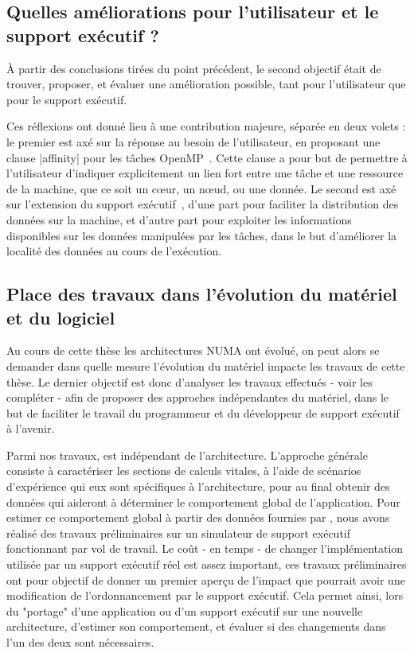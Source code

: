 \subsection*{Quelles améliorations pour l'utilisateur et le support exécutif ?}

À partir des conclusions tirées du point précédent, le second objectif était de trouver, proposer, et évaluer une amélioration possible, tant pour l'utilisateur que pour le support exécutif.

Ces réflexions ont donné lieu à une contribution majeure, séparée en deux volets : le premier est axé sur la réponse au besoin de l'utilisateur, en proposant une clause |affinity| pour les tâches OpenMP~\cite{Virouleau2016b}.
Cette clause a pour but de permettre à l'utilisateur d'indiquer explicitement un lien fort entre une tâche et une ressource de la machine, que ce soit un cœur, un nœud, ou une donnée.
Le second est axé sur l'extension du support exécutif~\cite{Virouleau2016a}, d'une part pour faciliter la distribution des données sur la machine, et d'autre part pour exploiter les informations disponibles sur les données manipulées par les tâches, dans le but d'améliorer la localité des données au cours de l'exécution.


\subsection*{Place des travaux dans l'évolution du matériel et du logiciel}

Au cours de cette thèse les architectures NUMA ont évolué, on peut alors se demander dans quelle mesure l'évolution du matériel impacte les travaux de cette thèse.
Le dernier objectif est donc d'analyser les travaux effectués - voir les compléter - afin de proposer des approches indépendantes du matériel, dans le but de faciliter le travail du programmeur et du développeur de support exécutif à l'avenir.

Parmi nos travaux, \outil est indépendant de l'architecture. L'approche générale consiste à caractériser les sections de calculs vitales, à l'aide de scénarios d'expérience qui eux sont spécifiques à l'architecture, pour au final obtenir des données qui aideront à déterminer le comportement global de l'application.
Pour estimer ce comportement global à partir des données fournies par \outil, nous avons réalisé des travaux préliminaires sur un simulateur de support exécutif fonctionnant par vol de travail.
Le coût - en temps - de changer l'implémentation utilisée par un support exécutif réel est assez important, ces travaux préliminaires ont pour objectif de donner un premier aperçu de l'impact que pourrait avoir une modification de l'ordonnancement par le support exécutif.
Cela permet ainsi, lors du "portage" d'une application ou d'un support exécutif sur une nouvelle architecture, d'estimer son comportement, et évaluer si des changements dans l'un des deux sont nécessaires.

